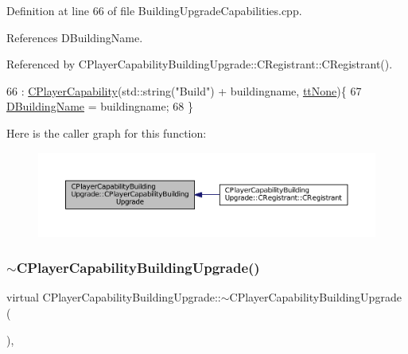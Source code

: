 Definition at line 66 of file Building\+Upgrade\+Capabilities.\+cpp.



References D\+Building\+Name.



Referenced by C\+Player\+Capability\+Building\+Upgrade\+::\+C\+Registrant\+::\+C\+Registrant().


\begin{DoxyCode}
66                                                                                                 : 
      \hyperlink{classCPlayerCapability_a303de62aba5d3f65d9a8e013c64a96c1}{CPlayerCapability}(std::string(\textcolor{stringliteral}{"Build"}) + buildingname, \hyperlink{classCPlayerCapability_a9d3450ed1532fd536bd6cbb1e2eef02fac78f0e806a6b0ead030d63c27c9ce929}{ttNone})\{
67     \hyperlink{classCPlayerCapabilityBuildingUpgrade_a244e767a3e669441cfb03c13bf703e64}{DBuildingName} = buildingname;
68 \}
\end{DoxyCode}
Here is the caller graph for this function\+:\nopagebreak
\begin{figure}[H]
\begin{center}
\leavevmode
\includegraphics[width=350pt]{classCPlayerCapabilityBuildingUpgrade_a80ccec4b17a9e43914bec537dcbe1b9e_icgraph}
\end{center}
\end{figure}
\hypertarget{classCPlayerCapabilityBuildingUpgrade_abcef586e377c86c3da3cd698dca268ef}{}\label{classCPlayerCapabilityBuildingUpgrade_abcef586e377c86c3da3cd698dca268ef} 
\subsubsection{\texorpdfstring{$\sim$\+C\+Player\+Capability\+Building\+Upgrade()}{~CPlayerCapabilityBuildingUpgrade()}}
{\footnotesize\ttfamily virtual C\+Player\+Capability\+Building\+Upgrade\+::$\sim$\+C\+Player\+Capability\+Building\+Upgrade (\begin{DoxyParamCaption}{ }\end{DoxyParamCaption})\hspace{0.3cm}{\ttfamily [inline]}, {\ttfamily [virtual]}}



